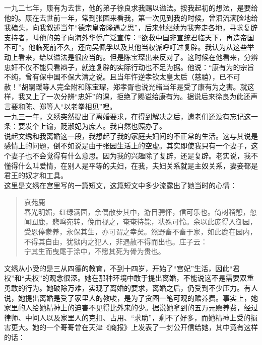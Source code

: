 一九二七年，康有为去世，他的弟子徐良求我赐以谥法。按我起初的想法，是要给他的。康在去世前一年，常到张园来看我，第一次见到我的时候，曾泪流满脸地给我磕头，向我叙述当年“德宗皇帝隆遇之思”，后来他继续为我奔走各地，寻求复辟支持者，叫他的弟子向海外华侨广泛宣传：“欲救中国非宣统君临天下，再造帝国不可”。他临死前不久，还向吴佩孚以及其他当权派呼吁过复辟。我认为从这些举动上看来，给以谥法是很应当的。但是陈宝琛出来反对了。这时候在他看来，分辨忠奸不仅不能只看辫子，就连复辟的实际行动也不足为据。他说：“康有为的宗旨不纯，曾有保中国不保大清之说。且当年忤逆孝钦太皇太后（慈禧），已不可赦！”胡嗣瑗等人完全附和陈宝琛，郑孝胥也说光绪当年是受了康有为之害。就这样，我又上了一次分辨“忠奸”的课，拒绝了赐谥给康有为。据说后来徐良为此还声言要和陈、郑等人“以老拳相见”哩。\\

一九三一年，文绣突然提出了离婚要求，在得到解决之后，遗老们还没有忘记这一条：要发个上谕，贬淑妃为庶人。我自然也照办了。\\

说起文绣和我离婚这一段，我想起了我的家庭夫妇间的不正常的生活。这与其说是感情上的问题，倒不如说是由于张园生活上的空虚。其实即使我只有一个妻子，这个妻子也不会觉得有什么意思。因为我的兴趣除了复辟，还是复辟。老实说，我不懂得什么叫爱情，在别人是平等的夫妇，在我，夫妇关系就是主奴关系，妻妾都是君王的奴才和工具。\\

这里是文绣在宫里写的一篇短文，这篇短文中多少流露出了她当时的心情：\\

\begin{quote}
	哀苑鹿\\

春光明媚，红绿满园，余偶散步其中，游目骋怀，信可乐也。倚树稍憩，忽闻囿鹿，悲鸣宛转，俛而视之，奄奄待毙，状殊可怜。余以此庞得入御园，受恩俸豢养，永保其生，亦可谓之幸矣。然野畜不畜于家，如此鹿在园内，不得其自由，犹狱内之犯人，非遇赦不得而出也。庄子云：\\

宁其生而曳尾于涂中，不愿其死为骨为贵也。\\
\end{quote}

文绣从小受的是三从四德的教育，不到十四岁，开始了“宫妃”生活，因此“君权”和“夫权”的观念很深。她在那种环境中敢于提出离婚，不能说这不是需要双重勇敢的行为。她破除万难，实现了离婚的要求，离婚之后，仍受到不少压力。有人说，她提出离婚是受了家里人的教唆，是为了贪图一笔可观的赡养费。事实上，她家里的人给她精神上的迫害不见得比外来的少。据说她拿到的五万元赡养费，经过律师、中间人以及家里人的克扣、占用、“求助”，剩不了好多，而她精神上受的损害更大。她的一个哥哥曾在天津《商报》上发表了一封公开信给她，其中竟有这样的话：\\

